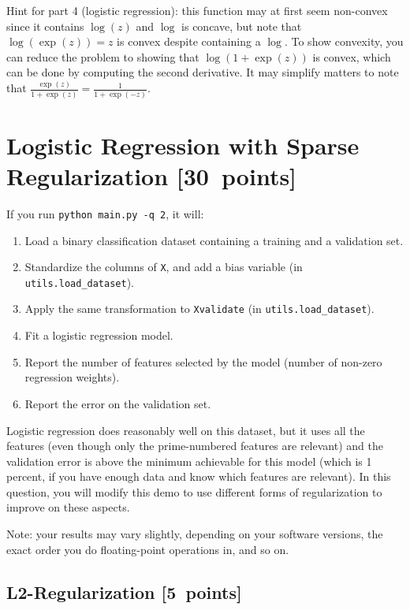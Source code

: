 \documentclass{article}
\newcommand\pts[1]{\textcolor{pointscolour}{[#1~points]}}
\begin{document}
Hint for part 4 (logistic regression): this function may at first seem non-convex since it contains $\log(z)$ and $\log$ is concave, but note that $\log(\exp(z))=z$ is convex despite containing a $\log$. To show convexity, you can reduce the problem to showing that $\log(1+\exp(z))$ is convex, which can be done by computing the second derivative. It may simplify matters to note that $\frac{\exp(z)}{1+\exp(z)} = \frac{1}{1+\exp(-z)}$.


\clearpage
\section{Logistic Regression with Sparse Regularization \pts{30}}

If you run  \verb|python main.py -q 2|, it will:
\begin{enumerate}
\item Load a binary classification dataset containing a training and a validation set.
\item Standardize the columns of \verb|X|, and add a bias variable (in \verb|utils.load_dataset|).
\item Apply the same transformation to \verb|Xvalidate| (in \verb|utils.load_dataset|).
\item Fit a logistic regression model.
\item Report the number of features selected by the model (number of non-zero regression weights).
\item Report the error on the validation set.
\end{enumerate}
Logistic regression does reasonably well on this dataset,
but it uses all the features (even though only the prime-numbered features are relevant)
and the validation error is above the minimum achievable for this model
(which is 1 percent, if you have enough data and know which features are relevant).
In this question, you will modify this demo to use different forms of regularization
 to improve on these aspects.

Note: your results may vary slightly, depending on your software versions, the exact order you do floating-point operations in, and so on.


\subsection{L2-Regularization \pts{5}}
\end{document}
